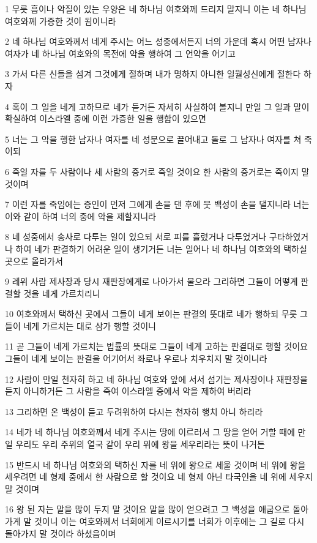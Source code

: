 \par 1 무릇 흠이나 악질이 있는 우양은 네 하나님 여호와께 드리지 말지니 이는 네 하나님 여호와께 가증한 것이 됨이니라
\par 2 네 하나님 여호와께서 네게 주시는 어느 성중에서든지 너의 가운데 혹시 어떤 남자나 여자가 네 하나님 여호와의 목전에 악을 행하여 그 언약을 어기고
\par 3 가서 다른 신들을 섬겨 그것에게 절하며 내가 명하지 아니한 일월성신에게 절한다 하자
\par 4 혹이 그 일을 네게 고하므로 네가 듣거든 자세히 사실하여 볼지니 만일 그 일과 말이 확실하여 이스라엘 중에 이런 가증한 일을 행함이 있으면
\par 5 너는 그 악을 행한 남자나 여자를 네 성문으로 끌어내고 돌로 그 남자나 여자를 쳐 죽이되
\par 6 죽일 자를 두 사람이나 세 사람의 증거로 죽일 것이요 한 사람의 증거로는 죽이지 말 것이며
\par 7 이런 자를 죽임에는 증인이 먼저 그에게 손을 댄 후에 뭇 백성이 손을 댈지니라 너는 이와 같이 하여 너의 중에 악을 제할지니라
\par 8 네 성중에서 송사로 다투는 일이 있으되 서로 피를 흘렸거나 다투었거나 구타하였거나 하여 네가 판결하기 어려운 일이 생기거든 너는 일어나 네 하나님 여호와의 택하실 곳으로 올라가서
\par 9 레위 사람 제사장과 당시 재판장에게로 나아가서 물으라 그리하면 그들이 어떻게 판결할 것을 네게 가르치리니
\par 10 여호와께서 택하신 곳에서 그들이 네게 보이는 판결의 뜻대로 네가 행하되 무릇 그들이 네게 가르치는 대로 삼가 행할 것이니
\par 11 곧 그들이 네게 가르치는 법률의 뜻대로 그들이 네게 고하는 판결대로 행할 것이요 그들이 네게 보이는 판결을 어기어서 좌로나 우로나 치우치지 말 것이니라
\par 12 사람이 만일 천자히 하고 네 하나님 여호와 앞에 서서 섬기는 제사장이나 재판장을 듣지 아니하거든 그 사람을 죽여 이스라엘 중에서 악을 제하여 버리라
\par 13 그리하면 온 백성이 듣고 두려워하여 다시는 천자히 행치 아니 하리라
\par 14 네가 네 하나님 여호와께서 네게 주시는 땅에 이르러서 그 땅을 얻어 거할 때에 만일 우리도 우리 주위의 열국 같이 우리 위에 왕을 세우리라는 뜻이 나거든
\par 15 반드시 네 하나님 여호와의 택하신 자를 네 위에 왕으로 세울 것이며 네 위에 왕을 세우려면 네 형제 중에서 한 사람으로 할 것이요 네 형제 아닌 타국인을 네 위에 세우지 말 것이며
\par 16 왕 된 자는 말을 많이 두지 말 것이요 말을 많이 얻으려고 그 백성을 애굽으로 돌아가게 말 것이니 이는 여호와께서 너희에게 이르시기를 너희가 이후에는 그 길로 다시 돌아가지 말 것이라 하셨음이며
